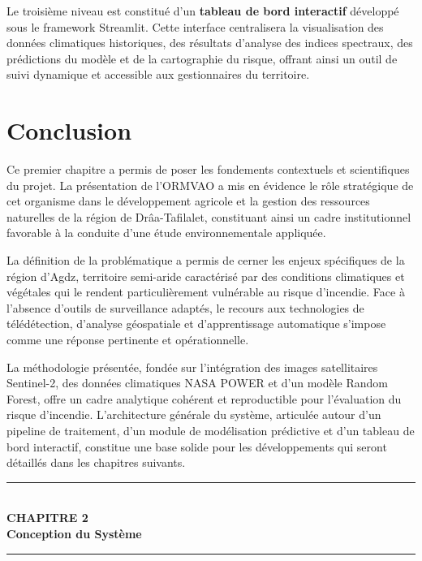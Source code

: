 \documentclass[12pt,a4paper]{report}
\begin{document}
Le troisième niveau est constitué d'un \textbf{tableau de bord interactif} développé sous le framework Streamlit. Cette interface centralisera la visualisation des données climatiques historiques, des résultats d'analyse des indices spectraux, des prédictions du modèle et de la cartographie du risque, offrant ainsi un outil de suivi dynamique et accessible aux gestionnaires du territoire.

\clearpage
\chapter*{Conclusion}

Ce premier chapitre a permis de poser les fondements contextuels et scientifiques du projet. La présentation de l'ORMVAO a mis en évidence le rôle stratégique de cet organisme dans le développement agricole et la gestion des ressources naturelles de la région de Drâa-Tafilalet, constituant ainsi un cadre institutionnel favorable à la conduite d'une étude environnementale appliquée.

La définition de la problématique a permis de cerner les enjeux spécifiques de la région d'Agdz, territoire semi-aride caractérisé par des conditions climatiques et végétales qui le rendent particulièrement vulnérable au risque d'incendie. Face à l'absence d'outils de surveillance adaptés, le recours aux technologies de télédétection, d'analyse géospatiale et d'apprentissage automatique s'impose comme une réponse pertinente et opérationnelle.

La méthodologie présentée, fondée sur l'intégration des images satellitaires Sentinel-2, des données climatiques NASA POWER et d'un modèle Random Forest, offre un cadre analytique cohérent et reproductible pour l'évaluation du risque d'incendie. L'architecture générale du système, articulée autour d'un pipeline de traitement, d'un module de modélisation prédictive et d'un tableau de bord interactif, constitue une base solide pour les développements qui seront détaillés dans les chapitres suivants.



\clearpage
\thispagestyle{empty}
\vspace*{\fill}
\begin{center}
  \rule{0.5\linewidth}{1.5pt}\\[1.2cm]
  {\fontsize{16}{20}\selectfont\bfseries\color{darkblue} CHAPITRE 2}\\[1cm]
  {\fontsize{18}{24}\selectfont\bfseries\color{darkblue}
    Conception du Système}\\[1.2cm]
  \rule{0.5\linewidth}{1.5pt}
\end{center}
\vspace*{\fill}
\clearpage
\end{document}
